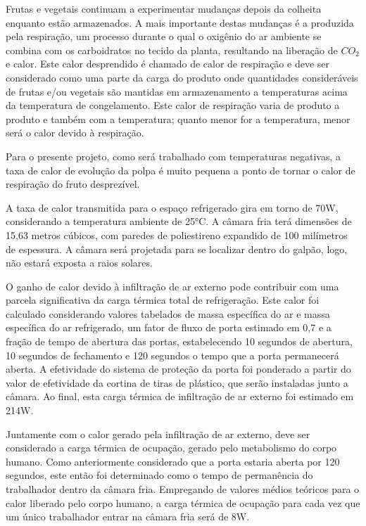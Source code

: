 \documentclass[10pt,a4paper]{article}
\begin{document}
Frutas e vegetais continuam a experimentar mudanças depois da colheita enquanto estão armazenados. A mais importante destas mudanças é a produzida pela respiração, um processo durante o qual o oxigênio do ar ambiente se combina com os carboidratos no tecido da planta, resultando na liberação de $CO_2$ e calor.  Este calor desprendido é chamado de calor de respiração e deve ser considerado como uma parte da carga do produto onde quantidades consideráveis de frutas e/ou vegetais são mantidas em armazenamento a temperaturas acima da temperatura de congelamento. Este calor de respiração varia de produto a produto e também com a temperatura; quanto menor for a temperatura, menor será o calor devido à respiração.

Para o presente projeto, como será trabalhado com temperaturas negativas, a taxa de calor de evolução da polpa é muito pequena a ponto de tornar o calor de respiração do fruto desprezível.

A taxa de calor transmitida para o espaço refrigerado gira em torno de 70W, considerando a temperatura ambiente de 25°C. A câmara fria terá dimensões de 15,63 metros cúbicos, com paredes de poliestireno expandido de 100 milímetros de espessura. A câmara será projetada para se localizar dentro do galpão, logo, não estará exposta a raios solares.

O ganho de calor devido à infiltração de ar externo pode contribuir com uma parcela significativa da carga térmica total de refrigeração. Este calor foi calculado considerando valores tabelados de massa específica do ar e massa específica do ar refrigerado, um fator de fluxo de porta estimado em 0,7 e a fração de tempo de abertura das portas, estabelecendo 10 segundos de abertura, 10 segundos de fechamento e 120 segundos o tempo que a porta permanecerá aberta. A efetividade do sistema de proteção da porta foi ponderado a partir do valor de efetividade da cortina de tiras de plástico, que serão instaladas junto a câmara. Ao final, esta carga térmica de infiltração de ar externo foi estimado em 214W.

Juntamente com o calor gerado pela infiltração de ar externo, deve ser considerado a carga térmica de ocupação, gerado pelo metabolismo do corpo humano. Como anteriormente considerado que a porta estaria aberta por 120 segundos, este então foi determinado como o tempo de permanência do trabalhador dentro da câmara fria. Empregando de valores médios teóricos para o calor liberado pelo corpo humano, a carga térmica de ocupação para cada vez que um único trabalhador entrar na câmara fria será de 8W.
\end{document}
